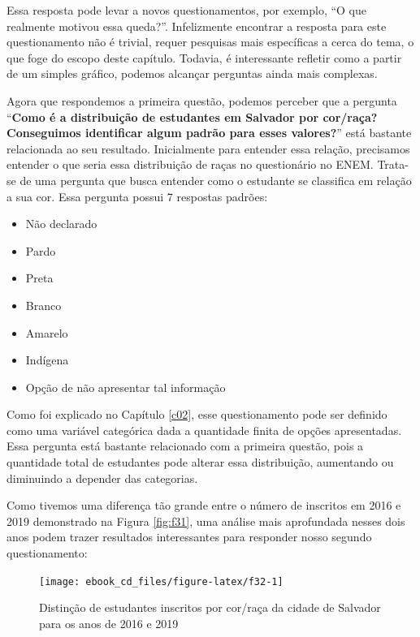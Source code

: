 \documentclass[
  portuguese,
  oneside]{book}
\begin{document}
Essa resposta pode levar a novos questionamentos, por exemplo, ``O que realmente motivou essa queda?''. Infelizmente encontrar a resposta para este questionamento não é trivial, requer pesquisas mais específicas a cerca do tema, o que foge do escopo deste capítulo. Todavia, é interessante refletir como a partir de um simples gráfico, podemos alcançar perguntas ainda mais complexas.

Agora que respondemos a primeira questão, podemos perceber que a pergunta ``\textbf{Como é a distribuição de estudantes em Salvador por cor/raça? Conseguimos identificar algum padrão para esses valores?}'' está bastante relacionada ao seu resultado.
Inicialmente para entender essa relação, precisamos entender o que seria essa distribuição de raças no questionário no ENEM. Trata-se de uma pergunta que busca entender como o estudante se classifica em relação a sua cor. Essa pergunta possui 7 respostas padrões:

\begin{itemize}
\item
  Não declarado
\item
  Pardo
\item
  Preta
\item
  Branco
\item
  Amarelo
\item
  Indígena
\item
  Opção de não apresentar tal informação
\end{itemize}

Como foi explicado no Capítulo \ref{c02}, esse questionamento pode ser definido como uma variável categórica dada a quantidade finita de opções apresentadas. Essa pergunta está bastante relacionado com a primeira questão, pois a quantidade total de estudantes pode alterar essa distribuição, aumentando ou diminuindo a depender das categorias.

Como tivemos uma diferença tão grande entre o número de inscritos em 2016 e 2019 demonstrado na Figura \ref{fig:f31}, uma análise mais aprofundada nesses dois anos podem trazer resultados interessantes para responder nosso segundo questionamento:

\begin{figure}

{\centering \texttt{[image: ebook\_cd\_files/figure-latex/f32-1]} 

}

\caption{Distinção de estudantes inscritos por cor/raça da cidade de Salvador para os anos de 2016 e 2019}\label{fig:f32}
\end{figure}
\end{document}
